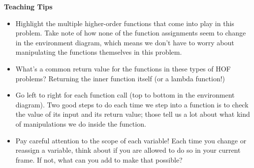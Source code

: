\begin{blocksection}
\begin{guide}
\textbf{Teaching Tips}
\begin{itemize}
\item Highlight the multiple higher-order functions that come into play in this problem. Take note of how none of the function assignments seem to change in the environment diagram, which means we don't have to worry about manipulating the functions themselves in this problem.
\item What's a common return value for the functions in these types of HOF problems? Returning the inner function itself (or a lambda function!)
\item Go left to right for each function call (top to bottom in the environment diagram). Two good steps to do each time we step into a function is to check the value of its input and its return value; those tell us a lot about what kind of manipulations we do inside the function.
\item Pay careful attention to the scope of each variable! Each time you change or reassign a variable, think about if you are allowed to do so in your current frame. If not, what can you add to make that possible?
\end{itemize}
\end{guide}
\end{blocksection}
